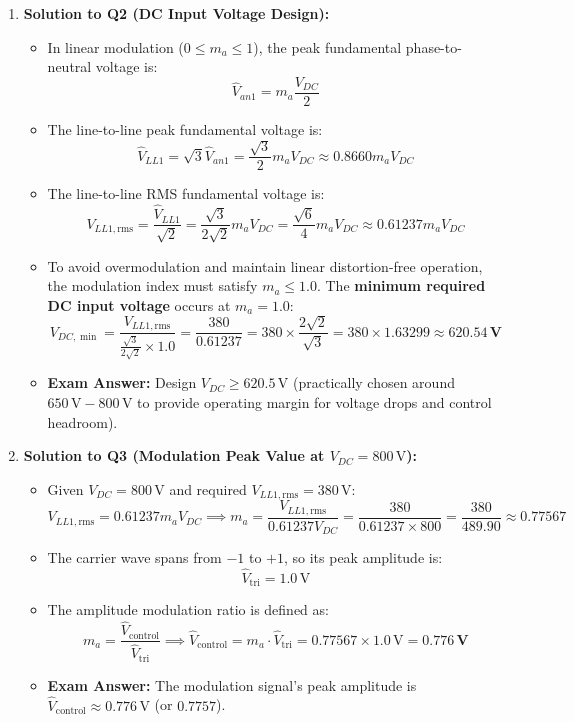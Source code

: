 \begin{enumerate}
  \item \textbf{Solution to Q2 (DC Input Voltage Design):}
  \begin{itemize}
    \item In linear modulation ($0 \le m_a \le 1$), the peak fundamental phase-to-neutral voltage is:
    \[
    \hat{V}_{an1} = m_a \frac{V_{DC}}{2}
    \]
    \item The line-to-line peak fundamental voltage is:
    \[
    \hat{V}_{LL1} = \sqrt{3} \hat{V}_{an1} = \frac{\sqrt{3}}{2} m_a V_{DC} \approx 0.8660 m_a V_{DC}
    \]
    \item The line-to-line RMS fundamental voltage is:
    \[
    V_{LL1,\mathrm{rms}} = \frac{\hat{V}_{LL1}}{\sqrt{2}} = \frac{\sqrt{3}}{2\sqrt{2}} m_a V_{DC} = \frac{\sqrt{6}}{4} m_a V_{DC} \approx 0.61237 m_a V_{DC}
    \]
    \item To avoid overmodulation and maintain linear distortion-free operation, the modulation index must satisfy $m_a \le 1.0$. The \textbf{minimum required DC input voltage} occurs at $m_a = 1.0$:
    \[
    V_{DC,\min} = \frac{V_{LL1,\mathrm{rms}}}{\frac{\sqrt{3}}{2\sqrt{2}} \times 1.0} = \frac{380}{0.61237} = 380 \times \frac{2\sqrt{2}}{\sqrt{3}} = 380 \times 1.63299 \approx \mathbf{620.54\,\si{\volt}}
    \]
    \item \textbf{Exam Answer:} Design $V_{DC} \ge 620.5\,\si{\volt}$ (practically chosen around $650\,\si{\volt} - 800\,\si{\volt}$ to provide operating margin for voltage drops and control headroom).
  \end{itemize}

  \item \textbf{Solution to Q3 (Modulation Peak Value at $V_{DC} = 800\,\si{\volt}$):}
  \begin{itemize}
    \item Given $V_{DC} = 800\,\si{\volt}$ and required $V_{LL1,\mathrm{rms}} = 380\,\si{\volt}$:
    \[
    V_{LL1,\mathrm{rms}} = 0.61237 m_a V_{DC} \implies m_a = \frac{V_{LL1,\mathrm{rms}}}{0.61237 V_{DC}} = \frac{380}{0.61237 \times 800} = \frac{380}{489.90} \approx \mathbf{0.77567}
    \]
    \item The carrier wave spans from $-1$ to $+1$, so its peak amplitude is:
    \[
    \hat{V}_{\mathrm{tri}} = 1.0\,\si{\volt}
    \]
    \item The amplitude modulation ratio is defined as:
    \[
    m_a = \frac{\hat{V}_{\mathrm{control}}}{\hat{V}_{\mathrm{tri}}} \implies \hat{V}_{\mathrm{control}} = m_a \cdot \hat{V}_{\mathrm{tri}} = 0.77567 \times 1.0\,\si{\volt} = \mathbf{0.776\,\si{\volt}}
    \]
    \item \textbf{Exam Answer:} The modulation signal's peak amplitude is $\hat{V}_{\mathrm{control}} \approx 0.776\,\si{\volt}$ (or $0.7757$).
  \end{itemize}
\end{enumerate}

